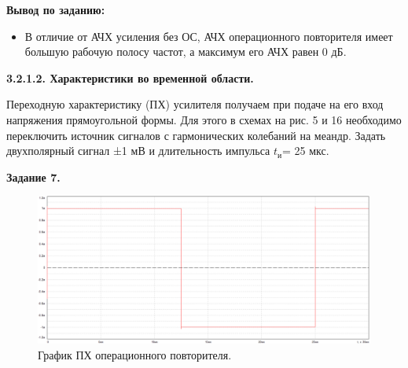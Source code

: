 \documentclass[a4paper,14pt]{extarticle}
\begin{document}
    \vspace{-0,5cm}
    \textbf{Вывод по заданию:}
    \vspace{-0,5cm}

    \begin{itemize}
        \item В отличие от АЧХ усиления без ОС, АЧХ операционного повторителя имеет большую рабочую полосу частот, а максимум его АЧХ равен 0 дБ.
    \end{itemize}

    \vspace{-0,5cm}
    \begin{center}
        \textbf{3.2.1.2. Характеристики во временной области.}
    \end{center}
    \vspace{-0,5cm}

    Переходную характеристику (ПХ) усилителя получаем при подаче на его 
    вход напряжения прямоугольной формы. Для этого в схемах на рис. 5 и 16 
    необходимо переключить источник сигналов с гармонических колебаний на 
    меандр. Задать двухполярный сигнал ±1 мВ и длительность импульса $t_\text{и}$= 
    25 мкс.

    \vspace{-0,5cm}
    \begin{center}
        \textbf{Задание 7.}
    \end{center}
    
    \begin{figure}[h!]
        \begin{center}
            \includegraphics[scale=0.24]{16.png}
        \end{center}
        \vspace{-0.7cm}
        \caption{График ПХ операционного повторителя.}
    \end{figure}
    \vspace{2cm}
\end{document}
